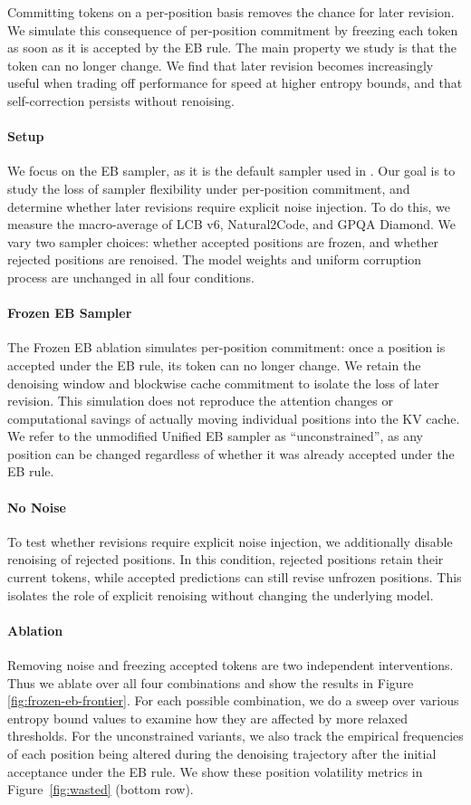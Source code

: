 Committing tokens on a per-position basis removes the chance for later revision.
We simulate this consequence of per-position commitment by freezing each token as soon as it is accepted by the EB rule.
The main property we study is that the token can no longer change.
We find that later revision becomes increasingly useful when trading off performance for speed at higher entropy bounds, and that self-correction persists without renoising.

\paragraph{Setup}
We focus on the EB sampler, as it is the default sampler used in \citet{team2026diffusiongemma}.
Our goal is to study the loss of sampler flexibility under per-position commitment, and determine whether later revisions require explicit noise injection.
To do this, we measure the macro-average of LCB v6, Natural2Code, and GPQA Diamond.
We vary two sampler choices: whether accepted positions are frozen, and whether rejected positions are renoised. The model weights and uniform corruption process are unchanged in all four conditions.

\paragraph{Frozen EB Sampler}
The Frozen EB ablation simulates per-position commitment: once a position is accepted under the EB rule, its token can no longer change. We retain the denoising window and blockwise cache commitment to isolate the loss of later revision. This simulation does not reproduce the attention changes or computational savings of actually moving individual positions into the KV cache.
We refer to the unmodified Unified EB sampler as ``unconstrained'', as any position can be changed regardless of whether it was already accepted under the EB rule.

\paragraph{No Noise}
To test whether revisions require explicit noise injection, we additionally disable renoising of rejected positions.
In this condition, rejected positions retain their current tokens, while accepted predictions can still revise unfrozen positions. This isolates the role of explicit renoising without changing the underlying model.

\paragraph{Ablation}
Removing noise and freezing accepted tokens are two independent interventions. Thus we ablate over all four combinations and show the results in Figure \ref{fig:frozen-eb-frontier}.
For each possible combination, we do a sweep over various entropy bound values to examine how they are affected by more relaxed thresholds.
For the unconstrained variants, we also track the empirical frequencies of each position being altered during the denoising trajectory after the initial acceptance under the EB rule.
We show these position volatility metrics in Figure~\ref{fig:wasted} (bottom row).

